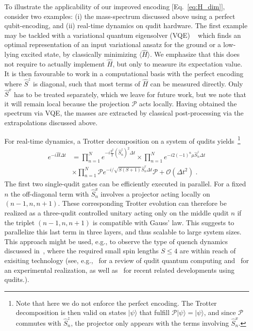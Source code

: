 \documentclass[aps,prl,reprint,twocolumn,superscriptaddress,floatfix,nofootinbib]{revtex4-1}
\begin{document}
	To illustrate the applicability of our improved encoding [Eq.~\eqref{eq:H_dim}], consider two examples: (i) the mass-spectrum discussed above using a perfect qubit-encoding, and (ii) real-time dynamics on qudit hardware. The first example may be tackled with a variational quantum eigensolver (VQE) ~\cite{cerezo2021variational,atas20212} which finds an optimal representation of an input variational ansatz for the ground or a low-lying excited state, by classically minimizing $\langle \hat{H}\rangle$. We emphasize that this does not require to actually implement $\hat{H}$, but only to measure its expectation value. It is then favourable to work in a computational basis with the perfect encoding where $\hat{S}^z$ is diagonal, such that most terms of $\hat{H}$ can be measured directly. Only $\hat{S}^x$ has to be treated separately, which we leave for future work, but we note that it will remain local because the projection $\mathcal{P}$ acts locally. Having obtained the spectrum via VQE, the masses are extracted by classical post-processing via the extrapolations discussed above.
	
	For real-time dynamics, a Trotter decomposition on a system of qudits yields~\footnote{Note that here we do not enforce the perfect encoding. The Trotter decomposition is then valid on states $|\psi\rangle$ that fulfill $\mathcal{P}|\psi\rangle = |\psi \rangle$, and since $\mathcal{P}$ commutes with $\hat{S}^z_n$, the projector only appears with the terms involving $\hat{S}^x_n$.}
	\begin{align}
		e^{-i\hat{H}\Delta t} &= \prod_{n=1}^N e^{-i\frac{g^2}{2} \left(\hat{S}^z_n\right)^2\Delta t} \times   \prod_{n=1}^N e^{-i2 (-1)^n\mu \hat{S}^z_n\Delta t} 
		\nonumber \\ &\times  \prod_{n=1}^N \mathcal{P} e^{-i/\sqrt{S(S+1)}\hat{S}^x_n\Delta t} \mathcal{P} + \mathcal{O}\left(\Delta t^2\right) \;.
	\end{align}
	The first two single-qudit gates can be efficiently executed in parallel. For a fixed $n$ the off-diagonal term with $\hat{S}^x_n$  involves a projector acting locally on $(n-1,n,n+1)$. These corresponding Trotter evolution can therefore be realized as a three-qudit controlled unitary acting only on the middle qudit $n$ if the triplet $(n-1,n,n+1)$ is compatible with Gauss' law. This suggests to parallelize this last term in three layers, and thus scalable to large system sizes. This approach might be used, e.g., to observe the type of quench dynamics discussed in~\cite{halimeh2021achieving}, where the required small spin lengths $S\le 4$ are within reach of exisiting technology (see, e.g.,~\cite{wang2020qudits} for a review of qudit quantum computing and~\cite{ringbauer2021universal} for an experimental realization, as well as~\cite{morvan2021qutrit,blok2021quantum,hill2021realization,kurkcuoglu2021quantum,alam2021quantum} for recent related developments using qudits.).
	
\end{document}
